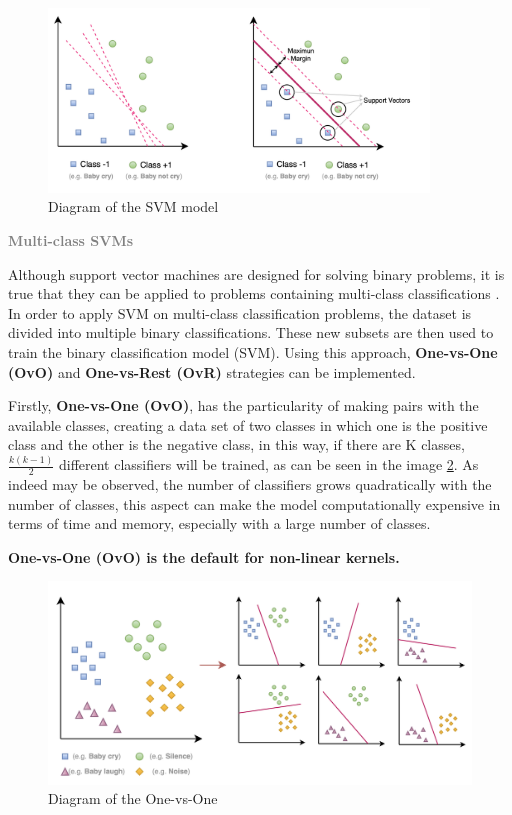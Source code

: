 \begin{figure}[h]
\centering
    \includegraphics[width=0.9\textwidth]{figures/SVM-model.png}
\caption{Diagram of the SVM model}
\label{fig:SVM-model}
\end{figure}

\newpage
{\fontsize{16pt}{16pt}\textcolor{gray}{\textbf{Multi-class SVMs}}}

Although support vector machines are designed for solving binary problems, it is true that they can be applied to problems containing multi-class classifications \cite{Liao2019}. In order to apply SVM on multi-class classification problems, the dataset is divided into multiple binary classifications. These new subsets are then used to train the binary classification model (SVM). Using this approach, \textbf{One-vs-One (OvO)} and \textbf{One-vs-Rest (OvR)} strategies can be implemented. 

\vspace{\baselineskip}
Firstly, \textbf{One-vs-One (OvO)}, has the particularity of making pairs with the available classes, creating a data set of two classes in which one is the positive class and the other is the negative class, in this way, if there are K classes, \( \frac{k(k-1)}{2} \) different classifiers will be trained, as can be seen in the image \ref{fig:OvO-SVM-model}. As indeed may be observed, the number of classifiers grows quadratically with the number of classes, this aspect can make the model computationally expensive in terms of time and memory, especially with a large number of classes.

\textbf{One-vs-One (OvO) is the default for non-linear kernels.}

\begin{figure}[h]
\centering
    \includegraphics[width=1\textwidth]{figures/One-vs-One.png}
\caption{Diagram of the One-vs-One}
\label{fig:OvO-SVM-model}
\end{figure}

